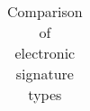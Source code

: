 \begin{table}[H]
	\begin{tabular}{|c|c|c|c|c|} \hline
	\end{tabular}
	\centering
	\caption{Comparison of electronic signature types}
	\label{Tab:comp}
\end{table}
